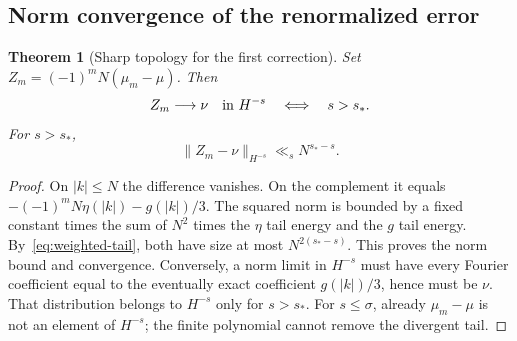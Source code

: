 \documentclass[11pt,a4paper]{article}
\numberwithin{equation}{section}
\newtheorem{theorem}{Theorem}[section]
\theoremstyle{definition}
\theoremstyle{remark}
\newcommand{\norm}[1]{\lVert #1\rVert}
\begin{document}
\subsection{Norm convergence of the renormalized error}
\begin{theorem}[Sharp topology for the first correction]
\label{thm:renormalized}
Set $Z_m=(-1)^mN(\mu_m-\mu)$. Then
\begin{equation}
 Z_m\longrightarrow\nu\quad\hbox{in }H^{-s}
 \quad\Longleftrightarrow\quad s>s_*.
 \label{eq:Z-limit}
\end{equation}
For $s>s_*$,
\begin{equation}
 \norm{Z_m-\nu}_{H^{-s}}\ll_s N^{s_*-s}.
 \label{eq:Z-rate}
\end{equation}
\end{theorem}
\begin{proof}
On $|k|\le N$ the difference vanishes. On the complement it equals
$-(-1)^mN\eta(|k|)-g(|k|)/3$. The squared norm is bounded by a fixed constant
times the sum of $N^2$ times the $\eta$ tail energy and the $g$ tail energy.
By~\eqref{eq:weighted-tail}, both have size at most $N^{2(s_*-s)}$.
This proves the norm bound and convergence. Conversely, a norm limit in
$H^{-s}$ must have every Fourier coefficient equal to the eventually exact
coefficient $g(|k|)/3$, hence must be $\nu$. That distribution belongs to
$H^{-s}$ only for $s>s_*$. For $s\le\sigma$, already $\mu_m-\mu$ is not an
element of $H^{-s}$; the finite polynomial cannot remove the divergent tail.
\end{proof}
\end{document}
